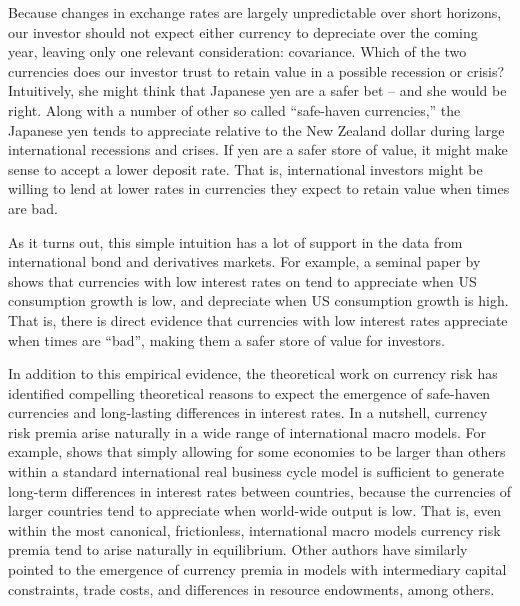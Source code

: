 \documentclass[12pt,letter]{article}
\theoremstyle{break} \theorembodyfont{\normalfont\itshape}
\theoremstyle{break}
\theoremstyle{break} \theorembodyfont{\normalfont\itshape}
\theoremstyle{break} \theorembodyfont{\normalfont\itshape}
\begin{document}
Because changes in exchange rates are largely unpredictable over short
horizons, our investor should not expect either currency to depreciate
over the coming year, leaving only one relevant consideration:
covariance. Which of the two currencies does our investor trust to
retain value in a possible recession or crisis? Intuitively, she might
think that Japanese yen are a safer bet -- and she would be right.
Along with a number of other so called ``safe-haven currencies,'' the
Japanese yen tends to appreciate relative to the New Zealand dollar
during large international recessions and crises. If yen are a safer
store of value, it might make sense to accept a lower deposit rate.
That is, international investors might be willing to lend at lower
rates in currencies they expect to retain value when times are bad.

As it turns out, this simple intuition has a lot of support in the
data from international bond and derivatives markets. For example, a
seminal paper by \citet{LustigVerdelhan2007} shows that currencies
with low interest rates on tend to appreciate when US consumption
growth is low, and depreciate when US consumption growth is high. That
is, there is direct evidence that currencies with low interest rates
appreciate when times are ``bad'', making them a safer store of value
for investors.

In addition to this empirical evidence, the theoretical work on
currency risk has identified compelling theoretical reasons to expect
the emergence of safe-haven currencies and long-lasting differences in
interest rates. In a nutshell, currency risk premia arise naturally in
a wide range of international macro models. For example,
\citet{Hassan2013} shows that simply allowing for some economies to be
larger than others within a standard international real business cycle
model is sufficient to generate long-term differences in interest
rates between countries, because the currencies of larger countries
tend to appreciate when world-wide output is low. That is, even within
the most canonical, frictionless, international macro models currency
risk premia tend to arise naturally in equilibrium. Other authors have
similarly pointed to the emergence of currency premia in models with
intermediary capital constraints, trade costs, and differences in
resource endowments, among others.
\end{document}
